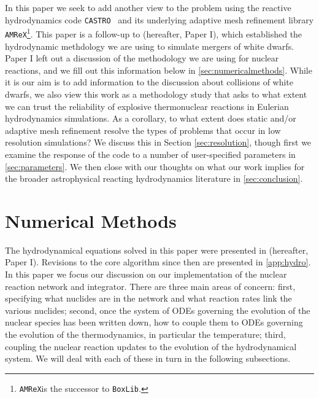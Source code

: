 \documentclass[twocolumn,numberedappendix]{../aastex6}
\newcommand{\amrex}{\texttt{AMReX}}
\newcommand{\boxlib}{\texttt{BoxLib}}
\newcommand{\castro}{\texttt{CASTRO}}
\begin{document}
In this paper we seek to add another view to the problem using the reactive hydrodynamics
code \castro\ \citep{castro} and its underlying adaptive mesh refinement library \amrex\footnote{\amrex is the successor to \boxlib.}.
This paper is a follow-up to \citet{wdmergerI} (hereafter, Paper I), which established
the hydrodynamic methdology we are using to simulate mergers of white dwarfs.
Paper I left out a discussion of the methodology we are using for nuclear reactions,
and we fill out this information below in \autoref{sec:numericalmethods}. While it is
our aim is to add information to the discussion about collisions of white dwarfs,
we also view this work as a methodology study that asks to what extent we
can trust the reliability of explosive thermonuclear reactions in Eulerian
hydrodynamics simulations. As a corollary, to what extent does static and/or
adaptive mesh refinement resolve the types of problems that occur in low resolution
simulations? We discuss this in Section \autoref{sec:resolution}, though first
we examine the response of the code to a number of user-specified parameters in
\autoref{sec:parameters}. We then close with our thoughts on what our work implies
for the broader astrophysical reacting hydrodynamics literature in \autoref{sec:conclusion}.



\section{Numerical Methods}
\label{sec:numericalmethods}

The hydrodynamical equations solved in this paper were presented in \citet{wdmergerI} (hereafter, Paper I).
Revisions to the core algorithm since then are presented in \autoref{app:hydro}.
In this paper we focus our discussion on our implementation of the nuclear
reaction network and integrator. There are three main areas of concern: first,
specifying what nuclides are in the network and what reaction rates link the
various nuclides; second, once the system of ODEs governing the evolution of
the nuclear species has been written down, how to couple them to ODEs governing
the evolution of the thermodynamics, in particular the temperature; third,
coupling the nuclear reaction updates to the evolution of the hydrodynamical
system. We will deal with each of these in turn in the following subsections.
\end{document}

